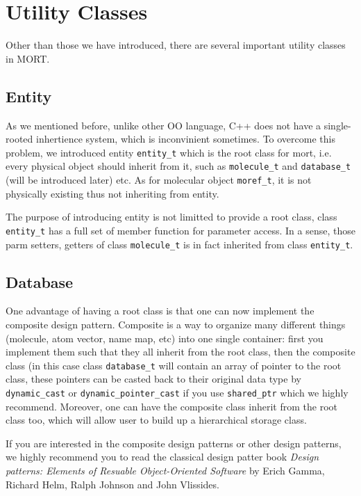 \documentclass[letterpaper]{book}
\begin{document}
\section{Utility Classes}

   Other than those we have introduced, there are several important utility classes in MORT.

\subsection{Entity}

  As we mentioned before, unlike other OO language, C++ does not have a single-rooted inhertience
system, which is inconvinient sometimes. To overcome this problem, we introduced entity \lstinline$entity_t$
which is the root class for mort, i.e. every physical object should inherit from it, such as
\lstinline$molecule_t$ and \lstinline$database_t$ (will be introduced later) etc. As for molecular object
\lstinline$moref_t$, it is not physically existing thus not inheriting from entity.

  The purpose of introducing entity is not limitted to provide a root class, class \lstinline$entity_t$
has a full set of member function for parameter access. In a sense, those parm setters, getters of class
\lstinline$molecule_t$ is in fact inherited from class \lstinline$entity_t$.


\subsection{Database}
  One advantage of having a root class is that one can now implement the composite design pattern. Composite 
is a way to organize many different things (molecule, atom vector, 
name map, etc) into one single container: first you implement them such that they all inherit from the root 
class, then the composite class (in this case class \lstinline$database_t$ will contain an array of pointer
to the root class, these pointers can be casted back to their original data type by \lstinline$dynamic_cast$
or \lstinline$dynamic_pointer_cast$ if you use \lstinline$shared_ptr$ which we highly recommend. Moreover,
one can have the composite class inherit from the root class too, which will allow user to build up a hierarchical
storage class.

  If you are interested in the composite design patterns or other design patterns, we highly recommend you to read
the classical design patter book {\it Design patterns: Elements of Resuable Object-Oriented Software} by Erich Gamma,
Richard Helm, Ralph Johnson and John Vlissides.
\end{document}
